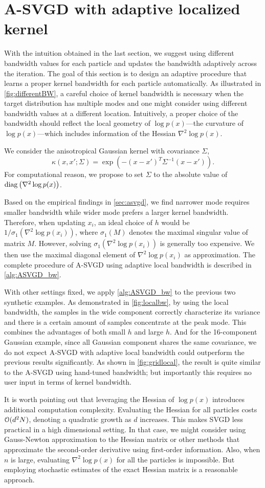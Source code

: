 \section{A-SVGD with adaptive localized kernel} \label{sec:bw}
With the intuition obtained in the last section, we suggest using different bandwidth values for each particle and updates the bandwidth adaptively across the iteration.
The goal of this section is to design an adaptive procedure that learns a proper kernel bandwidth for each particle automatically.    
As illustrated in  \cref{fig:differentBW}, a careful choice of kernel bandwidth is necessary when the target distribution has multiple modes and one might consider using different bandwidth values at a different location.  Intuitively, a proper choice of the bandwidth should reflect the local geometry of   $\log p(x)$---the curvature of $\log p(x)$---which includes information of the Hessian $\nabla^2 \log p(x)$.  

We consider the anisotropical Gaussian kernel with covariance $\Sigma$,
\[
\kappa(x, x'; \Sigma) = \exp(-(x - x')^T \Sigma^{-1}(x- x')  ).  
\]
For computational reason, we propose to set $\Sigma $ to the absolute value of $\operatorname{diag} \left(\nabla^2 \log p(x) \right)$.


Based on the empirical findings in \cref{sec:asvgd}, we find narrower mode requires smaller bandwidth while wider mode prefers a larger kernel bandwidth. 
Therefore, when updating $x_i$, an ideal choice of $h$ would be $1/ \sigma_1(\nabla^2 \log p(x_i))$, where $\sigma_1(M)$ denotes the maximal singular value of matrix $M$. However, solving  $\sigma_1(\nabla^2 \log p(x_i))$ is generally too expensive. We then use the maximal diagonal element of $\nabla^2 \log p(x_i)$ as approximation. The complete procedure of A-SVGD using adaptive local bandwidth is described in \cref{alg:ASVGD_bw}.

With other settings fixed, we apply \cref{alg:ASVGD_bw} to the previous two synthetic examples. As demonstrated in \cref{fig:localbw}, by using the local bandwidth, the samples in the wide component correctly characterize its variance and there is a certain amount of samples concentrate at the peak mode. This combines the advantages of both small $h$ and large $h$. And for the 16-component Gaussian example, since all Gaussian component shares the same covariance, we do not expect  A-SVGD with adaptive local bandwidth could outperform the previous results significantly. As shown in \cref{fig:gridlocal}, the result is quite similar to the A-SVGD using hand-tuned bandwidth; but importantly this  requires no user input in terms of kernel bandwidth.

It is worth pointing out that leveraging the Hessian of $\log p(x)$ introduces additional computation complexity. Evaluating the Hessian for all particles costs $\mathcal{O}(d^2N)$, denoting a quadratic growth as $d$ increases. This makes SVGD less practical in a high dimensional setting. In that case, we might consider using Gauss-Newton approximation to the Hessian matrix or other methods that approximate the second-order derivative using first-order information.
Also, when $n$ is large, evaluating $\nabla^2 \log p(x)$ for all the particles is impossible. But employing  stochastic estimates of the exact Hessian matrix is a reasonable approach.  